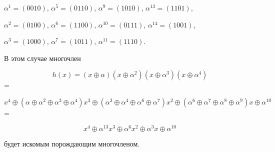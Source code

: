 \documentclass[12pt]{article}
\numberwithin{equation}{section} %
\begin{document}
    $\alpha^1=(0010)$,\hspace{1cm} $\alpha^5=(0110)$,\hspace{1cm} $\alpha^9=(1010)$,\hspace{1cm} $\alpha^{13}=(1101)$,
    
    $\alpha^2=(0100)$,\hspace{1cm} $\alpha^6=(1100)$,\hspace{1cm} $\alpha^{10}=(0111)$,\hspace{1cm} $\alpha^{14}=(1001)$,
    
    $\alpha^3=(1000)$,\hspace{1cm} $\alpha^7=(1011)$,\hspace{1cm} $\alpha^{11}=(1110)$.
   

	
	 В этом случае многочлен
	 
	 $$h(x)= (x \oplus \alpha)(x \oplus \alpha^2)
	 (x \oplus \alpha^3)
	 (x \oplus \alpha^4)$$=
	 
	 $$x^4 \oplus(\alpha \oplus \alpha^2 \oplus \alpha^3 \oplus \alpha^4)x^3
	 \oplus(\alpha^3 \oplus \alpha^4 \oplus \alpha^6 \oplus \alpha^7)x^2 \oplus
	     (\alpha^6 \oplus \alpha^7 \oplus \alpha^8 \oplus \alpha^9)x \oplus \alpha^{10}$$=
	     
	     $$x^4 \oplus \alpha^{13}x^3 \oplus \alpha^6x^2 \oplus \alpha^3x \oplus \alpha^{10}$$
	     
	 
	 
	 будет искомым порождающим многочленом.
\end{document}
